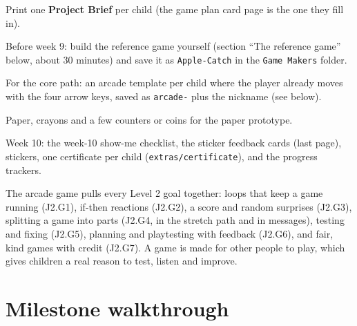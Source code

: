 \documentclass[track=junior,level=2,teacher]{kidscode}
\begin{document}
\begin{materials}
  \item Print one \textbf{Project Brief} per child (the game plan card page is the one they fill in).
  \item Before week 9: build the reference game yourself (section \enquote{The reference game} below,
        about 30 minutes) and save it as \texttt{Apple-Catch} in the \texttt{Game Makers} folder.
  \item For the core path: an arcade template per child where the player already moves with the
        four arrow keys, saved as \texttt{arcade-} plus the nickname (see below).
  \item Paper, crayons and a few counters or coins for the paper prototype.
  \item Week 10: the week-10 show-me checklist, the sticker feedback cards (last page), stickers,
        one certificate per child (\texttt{extras/\allowbreak{}certificate}), and the progress trackers.
\end{materials}

\begin{teachernote}
The arcade game pulls every Level 2 goal together: loops that keep a game running (J2.G1), if-then
reactions (J2.G2), a score and random surprises (J2.G3), splitting a game into parts (J2.G4, in the
stretch path and in messages), testing and fixing (J2.G5), planning and playtesting with feedback
(J2.G6), and fair, kind games with credit (J2.G7). A game is made for other people to play, which
gives children a real reason to test, listen and improve.
\end{teachernote}

\section{Milestone walkthrough}
\end{document}
